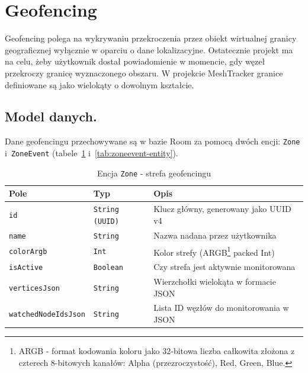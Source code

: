 \clearpage
\section{Geofencing}
\label{sec:geofencing}

Geofencing polega na wykrywaniu przekroczenia przez obiekt wirtualnej granicy
geograficznej wyłącznie w oparciu o dane lokalizacyjne. Ostatecznie projekt ma na celu,
żeby użytkownik dostał powiadomienie w momencie, gdy węzeł przekroczy granicę wyznaczonego 
obszaru. W projekcie MeshTracker granice definiowane są jako wielokąty o dowolnym kształcie.

\subsection*{Model danych.}

Dane geofencingu przechowywane są w bazie Room za pomocą dwóch encji:
\texttt{Zone} i~\texttt{ZoneEvent} (tabele~\ref{tab:zone-entity}
i~\ref{tab:zoneevent-entity}).

\begin{table}[!h]
    \caption{Encja \texttt{Zone} - strefa geofencingu}
    \label{tab:zone-entity}
    \centering
    \begin{tabular}{|l|l|p{7cm}|}
        \hline
        \textbf{Pole} & \textbf{Typ} & \textbf{Opis} \\
        \hline
        \texttt{id}                 & \texttt{String (UUID)} & Klucz główny, generowany jako UUID v4 \\
        \texttt{name}               & \texttt{String}        & Nazwa nadana przez użytkownika \\
        \texttt{colorArgb}          & \texttt{Int}           & Kolor strefy (ARGB\footnote{ARGB - format kodowania koloru jako 32-bitowa liczba całkowita złożona z czterech 8-bitowych kanałów: Alpha (przezroczystość), Red, Green, Blue.} packed Int) \\
        \texttt{isActive}           & \texttt{Boolean}       & Czy strefa jest aktywnie monitorowana \\
        \texttt{verticesJson}       & \texttt{String}        & Wierzchołki wielokąta w formacie JSON \\
        \texttt{watchedNodeIdsJson} & \texttt{String}        & Lista ID węzłów do monitorowania w JSON \\
        \hline
    \end{tabular}
\end{table}

